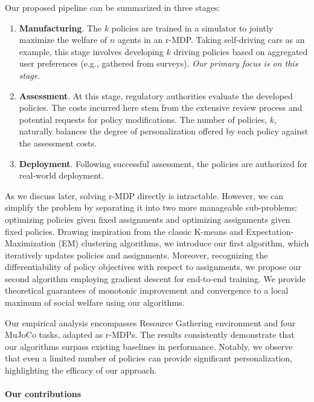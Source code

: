 \documentclass[letterpaper]{article} %
\begin{document}
Our proposed pipeline can be summarized in three stages:

\begin{enumerate}
    \item \textbf{Manufacturing}. The $k$ policies are trained in a simulator to jointly maximize the welfare of $n$ agents in an r-MDP. Taking self-driving cars as an example, this stage involves developing $k$ driving policies based on aggregated user preferences (e.g., gathered from surveys). \textit{Our primary focus is on this stage.}

    \item \textbf{Assessment}. At this stage, regulatory authorities evaluate the developed policies. The costs incurred here stem from the extensive review process and potential requests for policy modifications. The number of policies, $k$, naturally balances the degree of personalization offered by each policy against the assessment costs.

    \item \textbf{Deployment}.  Following successful assessment, the policies are authorized for real-world deployment.
\end{enumerate}


As we discuss later, solving r-MDP directly is intractable. However, we can simplify the problem by separating it into two more manageable sub-problems: optimizing policies given fixed assignments and optimizing assignments given fixed policies. Drawing inspiration from the classic K-means \cite{macqueen1967classification,lloyd1982least} and Expectation-Maximization (EM) \cite{dempster1977maximum}  clustering algorithms, we introduce our first algorithm, which iteratively updates policies and assignments. Moreover, recognizing the differentiability of policy objectives with respect to assignments, we propose our second algorithm employing gradient descent for end-to-end training. We provide theoretical guarantees of monotonic improvement and convergence to a local maximum of social welfare using our algorithms.

Our empirical analysis encompasses Resource Gathering environment \cite{barrett2008learning} and four MuJoCo \cite{todorov2012mujoco} tasks, adapted as r-MDPs. The results consistently demonstrate that our algorithms surpass existing baselines in performance. Notably, we observe that even a limited number of policies can provide significant personalization, highlighting the efficacy of our approach.

\paragraph{Our contributions}
\end{document}
